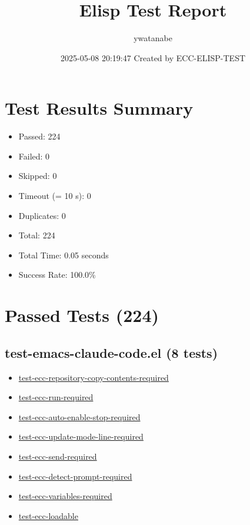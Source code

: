 \documentclass[11pt]{article}
\author{ywatanabe}
\date{2025-05-08 20:19:47 Created by ECC-ELISP-TEST}
\title{Elisp Test Report}
\begin{document}
\maketitle
\tableofcontents

\section{Test Results Summary}
\label{sec:org621ac30}

\begin{itemize}
\item Passed: 224
\item Failed: 0
\item Skipped: 0
\item Timeout (= 10 s): 0
\item Duplicates: 0
\item Total: 224
\item Total Time: 0.05 seconds
\item Success Rate: 100.0\%
\end{itemize}
\section{Passed Tests (224)}
\label{sec:org659f11d}
\subsection{test-emacs-claude-code.el (8 tests)}
\label{sec:orgdab708e}
\begin{itemize}
\item \href{test-emacs-claude-code.el}{test-ecc-repository-copy-contents-required}
\item \href{test-emacs-claude-code.el}{test-ecc-run-required}
\item \href{test-emacs-claude-code.el}{test-ecc-auto-enable-stop-required}
\item \href{test-emacs-claude-code.el}{test-ecc-update-mode-line-required}
\item \href{test-emacs-claude-code.el}{test-ecc-send-required}
\item \href{test-emacs-claude-code.el}{test-ecc-detect-prompt-required}
\item \href{test-emacs-claude-code.el}{test-ecc-variables-required}
\item \href{test-emacs-claude-code.el}{test-ecc-loadable}
\end{itemize}
\end{document}
